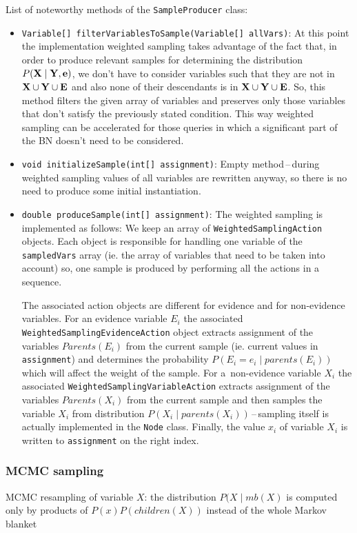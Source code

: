 \documentclass[english,cover]{fitthesis} %
\newcommand{\srccode}[1]{{\tt #1}}         %
\newcommand{\vars}[1]{{\bold{#1}}}         %
\newcommand{\todo}[1]{{\color{red}#1}}
\begin{document}
List of noteworthy methods of the \srccode{SampleProducer} class:
\begin{itemize}
	\item \srccode{Variable[] filterVariablesToSample(Variable[] allVars)}: At this point the implementation weighted sampling takes advantage of the fact that, in order to produce relevant samples for determining the distribution $P(\vars{X} \mid \vars{Y}, \vars{e})$, we don't have to consider variables such that they are not in $\vars{X} \cup \vars{Y} \cup \vars{E}$ and also none of their descendants is in $\vars{X} \cup \vars{Y} \cup \vars{E}$. So, this method filters the given array of variables and preserves only those variables that don't satisfy the previously stated condition. This way weighted sampling can be accelerated for those queries in which a significant part of the BN doesn't need to be considered.
	\item \srccode{void initializeSample(int[] assignment)}: Empty method\,--\,during weighted sampling values of all variables are rewritten anyway, so there is no need to produce some initial instantiation.
	\item \srccode{double produceSample(int[] assignment)}: The weighted sampling is implemented as follows: We keep an array of \srccode{WeightedSamplingAction} objects. Each object is responsible for handling one variable of the \srccode{sampledVars} array (ie. the array of variables that need to be taken into account) so, one sample is produced by performing all the actions in a sequence.
	
	The associated action objects are different for evidence and for non-evidence variables.	For an evidence variable $E_i$ the associated \srccode{WeightedSamplingEvidenceAction} object extracts assignment of the variables $Parents(E_i)$ from the current sample (ie. current values in \srccode{assignment}) and determines the probability $P(E_i = e_i \mid parents(E_i))$ which will affect the weight of the sample.
	For a~non-evidence variable $X_i$ the associated \srccode{WeightedSamplingVariableAction} extracts assignment of the variables $Parents(X_i)$ from the current sample and then samples the variable $X_i$ from distribution $P(X_i \mid parents(X_i))$\,--\,sampling itself is actually implemented in the \srccode{Node} class. Finally, the value $x_i$ of variable $X_i$ is written to \srccode{assignment} on the right index.
\end{itemize}


\subsubsection{MCMC sampling}
\todo{MCMC resampling of variable $X$: the distribution $P(X \mid mb(X)$ is computed only by products of $P(x) P(children(X))$ instead of the whole Markov blanket}
\end{document}

